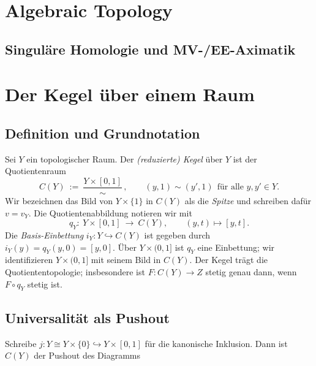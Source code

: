 \documentclass[10pt, letterpaper]{article}
\begin{document}
\vspace{0.8cm}


\pagebreak

\section{Algebraic Topology}



\subsection{Singuläre Homologie und MV-/EE-Aximatik}


\section{Der Kegel über einem Raum}\label{sec:cone}

\subsection{Definition und Grundnotation}
Sei $Y$ ein topologischer Raum. Der \emph{(reduzierte) Kegel} über $Y$ ist der Quotientenraum
\[
  C(Y)\ :=\ \frac{Y\times[0,1]}{\sim}\,,
  \qquad 
  (y,1)\sim(y',1)\ \ \text{für alle }y,y'\in Y.
\]
Wir bezeichnen das Bild von $Y\times\{1\}$ in $C(Y)$ als die \emph{Spitze} und schreiben dafür $v=v_Y$.
Die Quotientenabbildung notieren wir mit
\[
  q_Y:\ Y\times[0,1]\ \longrightarrow\ C(Y),\qquad (y,t)\longmapsto [y,t].
\]
Die \emph{Basis-Einbettung} $i_Y:Y\hookrightarrow C(Y)$ ist gegeben durch $i_Y(y)=q_Y(y,0)=[y,0]$.
Über $Y\times(0,1]$ ist $q_Y$ eine Einbettung; wir identifizieren $Y\times(0,1]$ mit seinem Bild in $C(Y)$.
Der Kegel trägt die Quotiententopologie; insbesondere ist $F:C(Y)\to Z$ stetig genau dann, wenn $F\circ q_Y$ stetig ist.

\subsection{Universalität als Pushout}
Schreibe $j:Y\cong Y\times\{0\}\hookrightarrow Y\times[0,1]$ für die kanonische Inklusion. Dann ist $C(Y)$ der Pushout des Diagramms
\begin{center}
\begingroup{}
\endgroup
\end{center}
\end{document}
